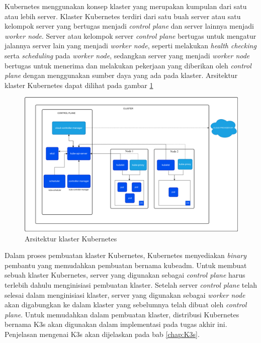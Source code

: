 Kubernetes menggunakan konsep klaster yang merupakan kumpulan dari satu atau
lebih server. Klaster Kubernetes terdiri dari satu buah server atau satu kelompok server yang
bertugas menjadi \emph{control plane} dan server lainnya menjadi \emph{worker node}.
Server atau kelompok server \emph{control plane} bertugas untuk mengatur jalannya
server lain yang menjadi \emph{worker node}, seperti melakukan \emph{health checking} serta
\emph{scheduling} pada \emph{worker node}, sedangkan server yang menjadi \emph{worker node}
bertugas untuk menerima dan melakukan pekerjaan yang diberikan oleh \emph{control plane}
dengan menggunakan sumber daya yang ada pada klaster. Arsitektur
klaster Kubernetes dapat dilihat pada gambar \ref{fig:arsitektur-cluster-kubernetes}

\begin{figure}[H]
  \centering

  \includegraphics[scale=0.15]{gambar/kubernetes-cluster-architecture.png}

  \caption{Arsitektur klaster Kubernetes}
  \label{fig:arsitektur-cluster-kubernetes}
\end{figure}

Dalam proses pembuatan klaster Kubernetes, Kubernetes menyediakan \emph{binary} pembantu
yang memudahkan pembuatan bernama kubeadm. Untuk membuat sebuah klaster Kubernetes,
server yang digunakan sebagai \emph{control plane} harus terlebih dahulu menginisiasi
pembuatan klaster. Setelah server \emph{control plane} telah selesai dalam menginisiasi klaster,
server yang digunakan sebagai \emph{worker node} akan digabungkan ke dalam klaster yang sebelumnya
telah dibuat oleh \emph{control plane}. Untuk memudahkan dalam pembuatan klaster, distribusi
Kubernetes bernama K3s akan digunakan dalam implementasi pada tugas akhir ini. Penjelasan
mengenai K3s akan dijelaskan pada bab \ref{chap:K3s}.

